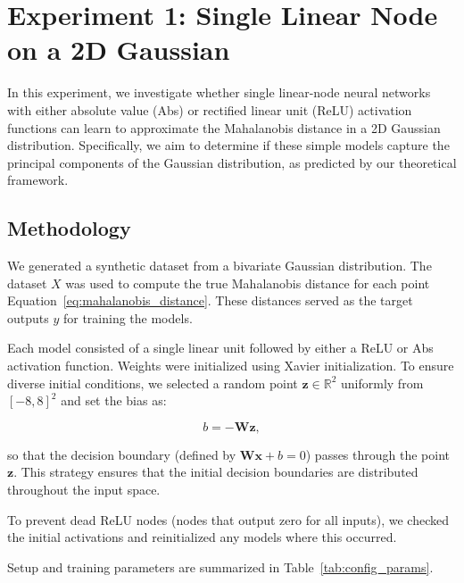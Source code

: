 \section{Experiment 1: Single Linear Node on a 2D Gaussian}
\label{sec:experiment1}

In this experiment, we investigate whether single linear-node neural networks with either absolute value (Abs) or rectified linear unit (ReLU) activation functions can learn to approximate the Mahalanobis distance in a 2D Gaussian distribution. Specifically, we aim to determine if these simple models capture the principal components of the Gaussian distribution, as predicted by our theoretical framework.

\subsection{Methodology}

We generated a synthetic dataset from a bivariate Gaussian distribution. The dataset $X$ was used to compute the true Mahalanobis distance for each point Equation~\eqref{eq:mahalanobis_distance}. These distances served as the target outputs $y$ for training the models.

Each model consisted of a single linear unit followed by either a ReLU or Abs activation function. Weights were initialized using Xavier initialization. To ensure diverse initial conditions, we selected a random point $\mathbf{z} \in \mathbb{R}^2$ uniformly from $[-8, 8]^2$ and set the bias as:

\begin{equation} b = -\mathbf{W} \mathbf{z}, \end{equation}

so that the decision boundary (defined by $\mathbf{W} \mathbf{x} + b = 0$) passes through the point $\mathbf{z}$. This strategy ensures that the initial decision boundaries are distributed throughout the input space.

To prevent dead ReLU nodes (nodes that output zero for all inputs), we checked the initial activations and reinitialized any models where this occurred.

Setup and training parameters are summarized in Table~\ref{tab:config_params}.

